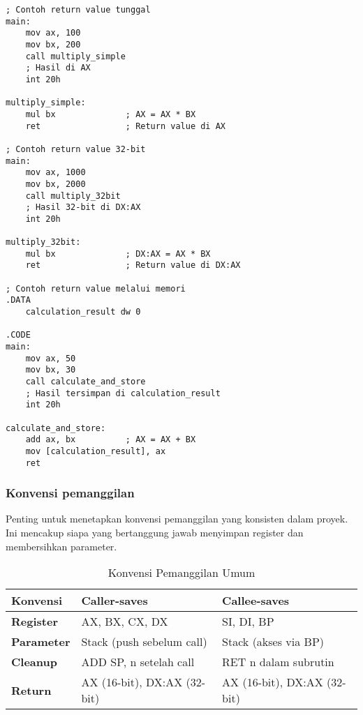\documentclass[../main.tex]{subfiles}
\begin{document}
                \begin{lstlisting}[language={[x86masm]Assembler}, caption=Return Value, label={lst:return-value}]
; Contoh return value tunggal
main:
    mov ax, 100
    mov bx, 200
    call multiply_simple
    ; Hasil di AX
    int 20h

multiply_simple:
    mul bx              ; AX = AX * BX
    ret                 ; Return value di AX

; Contoh return value 32-bit
main:
    mov ax, 1000
    mov bx, 2000
    call multiply_32bit
    ; Hasil 32-bit di DX:AX
    int 20h

multiply_32bit:
    mul bx              ; DX:AX = AX * BX
    ret                 ; Return value di DX:AX

; Contoh return value melalui memori
.DATA
    calculation_result dw 0

.CODE
main:
    mov ax, 50
    mov bx, 30
    call calculate_and_store
    ; Hasil tersimpan di calculation_result
    int 20h

calculate_and_store:
    add ax, bx          ; AX = AX + BX
    mov [calculation_result], ax
    ret
                \end{lstlisting}

            \subsubsection{Konvensi pemanggilan}
                Penting untuk menetapkan konvensi pemanggilan yang konsisten dalam proyek. Ini mencakup siapa yang bertanggung jawab menyimpan register dan membersihkan parameter.

                \begin{table}[H]
                    \centering
                    \caption{Konvensi Pemanggilan Umum}
                    \begin{tabular}{|p{3cm}|p{5cm}|p{5cm}|}
                        \hline
                        \textbf{Konvensi} & \textbf{Caller-saves} & \textbf{Callee-saves} \\
                        \hline
                        \textbf{Register} & AX, BX, CX, DX & SI, DI, BP \\
                        \hline
                        \textbf{Parameter} & Stack (push sebelum call) & Stack (akses via BP) \\
                        \hline
                        \textbf{Cleanup} & ADD SP, n setelah call & RET n dalam subrutin \\
                        \hline
                        \textbf{Return} & AX (16-bit), DX:AX (32-bit) & AX (16-bit), DX:AX (32-bit) \\
                        \hline
                    \end{tabular}
                    \label{tab:calling-conventions}
                \end{table}
\end{document}
